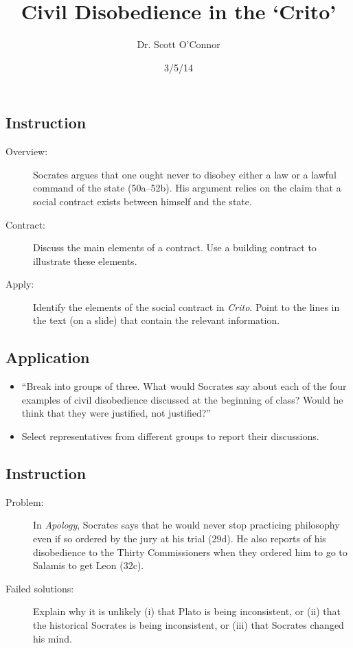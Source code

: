 \documentclass[11pt]{tufte-handout}
\title{Civil Disobedience in the `Crito'}
\author{Dr. Scott O'Connor}
\date{3/5/14}
\begin{document}
\maketitle
\begin{fullwidth}


\begin{multicols}{3}
\raggedcolumns
\subsection*{Instruction}
\begin{description}
\item[Overview:] Socrates argues that one ought never to disobey either a law or a lawful command of the state (50a--52b). His argument relies on the claim that a social contract exists between himself and the state. 
\item[Contract:] Discuss the main elements of a contract. Use a building contract to illustrate these elements.
\item[Apply:] Identify the elements of the social contract in \emph{Crito}. Point to the lines in the text (on a slide) that contain the relevant information. 
\end{description}
\columnbreak

\subsection*{Application}
\begin{itemize}
\item ``Break into groups of three. What would Socrates say about each of the four examples of civil disobedience discussed at the beginning of class? Would he think that they were justified, not justified?''
\item Select representatives from different groups to report their discussions. 
\end{itemize} 

\end{multicols}


\begin{multicols}{2}
\raggedcolumns
\subsection*{Instruction}

\begin{description}
\item[Problem:] In \emph{Apology}, Socrates says that he would never stop practicing philosophy even if so ordered by the jury at his trial (29d). He also reports of his disobedience to the Thirty Commissioners when they ordered him to go to Salamis to get Leon (32c). 
\item[Failed solutions:] Explain why it is unlikely (i) that Plato is being inconsistent, or  (ii) that the historical Socrates is being inconsistent, or (iii) that Socrates changed his mind.  
\end{description}
\columnbreak



\end{multicols}
\end{fullwidth}
\end{document}
